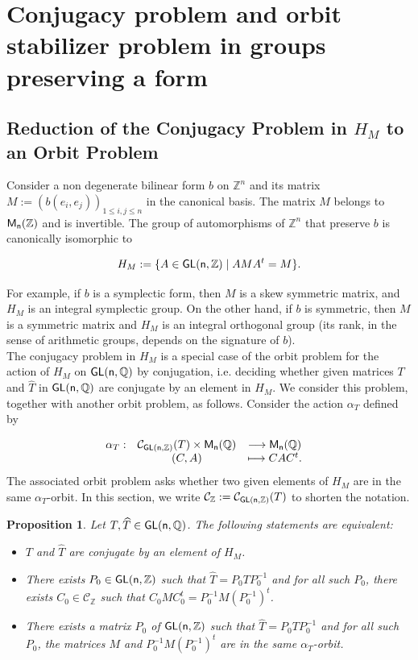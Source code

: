 \documentclass[a4paper,11pt]{article}
\newtheorem{proposition}{Proposition}[section]
\theoremstyle{definition}
\newcommand{\Z}{\mathbb Z}
\newcommand{\Q}{\mathbb Q}
\newcommand{\C}{\mathcal C}
\def \GL{\sf{GL}}
\newcommand{\M}{\sf{M}}
\begin{document}
\section{Conjugacy problem and orbit stabilizer problem in groups preserving a form}\label{section3}

\subsection[Reduction of the conjugacy problem in HM to an orbit problem] {Reduction of the Conjugacy Problem in $H_M$ to an Orbit Problem}

Consider a non degenerate bilinear form $b$ on $\Z^{n}$ and its matrix $M:=(b(e_i,e_j))_{1 \le i,j \le n}$ in the canonical basis. The matrix $M$ belongs to $\M_n(\Z)$ and is invertible. The group of automorphisms of $\Z^n$ that preserve $b$ is canonically isomorphic to 

$$H_M := \{ A \in \GL(n,\Z) \mid \text{$AMA^t = M$}\}.$$

For example, if $b$ is a symplectic form, then $M$ is a skew symmetric matrix, and $H_M$ is an integral symplectic group. On the other hand, if $b$ is symmetric, then $M$ is a symmetric matrix and $H_M$ is an integral orthogonal group (its rank, in the sense of arithmetic groups, depends  on the signature of $b$). \\
The conjugacy problem in $H_M$ is a special case of the orbit problem
for the action of $H_M$ on $\GL(n,\Q)$ by conjugation, i.e. deciding whether given matrices $T$ and $\widehat{T}$ in $\GL(n,\Q)$ are conjugate by an element in $H_M$. We consider this problem, together with another orbit problem, as follows. Consider the action $\alpha_T$ defined by

    \[
\begin{array}{ccccc}
\alpha_T:
&  \C_{\GL(n,\Z)}(T) \times \M_{n}(\Q) &  \longrightarrow \M_{n}(\Q) & \\
& (C,A) & \longmapsto CAC^t.\\
\end{array}
 \]
 The associated orbit problem asks whether two given elements of $H_M$ are in the same $\alpha_T$-orbit.
In this section, we write $\C_{\Z}:=\C_{\GL(n,\Z)}(T)$ to shorten the notation.


\begin{proposition}\label{proposition15}
Let $T, \widehat{T} \in \GL(n, \Q)$. The following statements are equivalent:
\begin{itemize}
    \item[(i)] $T$ and $\widehat{T}$ are conjugate by an element of $H_M$.
    \item[(ii)] There exists $P_0 \in \GL(n,\Z) $  such that  $\widehat{T}=P_0TP_0^{-1}$ and for all such $P_0$, there exists $C_0 \in \C_\Z$ such that $C_0MC_0^t=P_0^{-1}M(P_0^{-1})^t$.
    \item [(iii)] There exists a matrix $P_0$ of $\GL(n,\Z)$ such that $\widehat{T}=P_0TP_0^{-1} $ and for all such $P_0$, the matrices $M$ and $P_0^{-1}M(P_0^{-1})^t$ are in the same $\alpha_T$-orbit.
     
\end{itemize}
\end{proposition}
\end{document}

